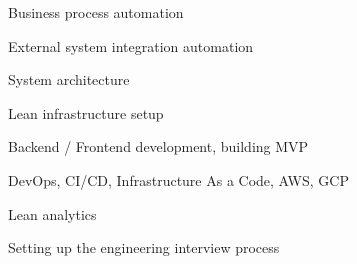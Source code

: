 \item Business process automation
\item External system integration automation
\item System architecture
\item Lean infrastructure setup
\item Backend / Frontend development, building MVP
\item DevOps, CI/CD, Infrastructure As a Code, AWS, GCP
\item Lean analytics
\item Setting up the engineering interview process

